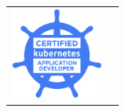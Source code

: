 \documentclass{article}
\begin{document}
\begin{tabular}{ll}
    \href{https://www.credly.com/badges/f496c372-5779-49d9-b51a-58aff3c5963b/public_url}{\includegraphics[width=3cm]{./images/ckad.png}} & 
\end{tabular}
\end{document}
